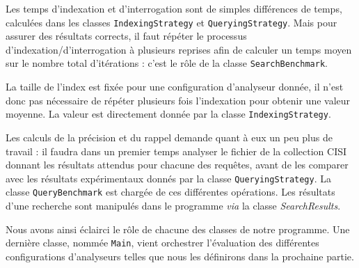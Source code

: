 Les temps d’indexation et d’interrogation sont de simples différences de temps, calculées dans les classes \texttt{IndexingStrategy} et \texttt{QueryingStrategy}. Mais pour assurer des résultats corrects, il faut répéter le processus d’indexation/d’interrogation à plusieurs reprises afin de calculer un temps moyen sur le nombre total d’itérations : c’est le rôle de la classe \texttt{SearchBenchmark}.

La taille de l’index est fixée pour une configuration d’analyseur donnée, il n’est donc pas nécessaire de répéter plusieurs fois l’indexation pour obtenir une valeur moyenne. La valeur est directement donnée par la classe \texttt{IndexingStrategy}.

Les calculs de la précision et du rappel demande quant à eux un peu plus de travail : il faudra dans un premier temps analyser le fichier de la collection CISI donnant les résultats attendus pour chacune des requêtes, avant de les comparer avec les résultats expérimentaux donnés par la classe \texttt{QueryingStrategy}. La classe \texttt{QueryBenchmark} est chargée de ces différentes opérations. Les résultats d’une recherche sont manipulés dans le programme \textit{via} la classe \textit{SearchResults}.

Nous avons ainsi éclairci le rôle de chacune des classes de notre programme. Une dernière classe, nommée \texttt{Main}, vient orchestrer l’évaluation des différentes configurations d’analyseurs telles que nous les définirons dans la prochaine partie.

